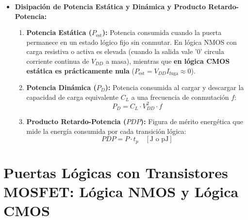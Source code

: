 \begin{itemize}[leftmargin=*]
    \item \textbf{Disipación de Potencia Estática y Dinámica y Producto Retardo-Potencia:}
    \begin{enumerate}[label=\alph*)]
        \item \textbf{Potencia Estática ($P_{\text{est}}$):} Potencia consumida cuando la puerta permanece en un estado lógico fijo sin conmutar. En lógica NMOS con carga resistiva o activa es elevada (cuando la salida vale '0' circula corriente continua de $V_{DD}$ a masa), mientras que \textbf{en lógica CMOS estática es prácticamente nula} ($P_{\text{est}} = V_{DD} I_{\text{fuga}} \approx 0$).
        \item \textbf{Potencia Dinámica ($P_D$):} Potencia consumida al cargar y descargar la capacidad de carga equivalente $C_L$ a una frecuencia de conmutación $f$:
        \begin{equation}
            P_D = C_L \cdot V_{DD}^2 \cdot f
        \end{equation}
        \item \textbf{Producto Retardo-Potencia ($PDP$):} Figura de mérito energética que mide la energía consumida por cada transición lógica:
        \begin{equation}
            PDP = P \cdot t_p \quad [\si{\joule} \text{ o } \si{\pico\joule}]
        \end{equation}
    \end{enumerate}
\end{itemize}

\section{Puertas Lógicas con Transistores MOSFET: Lógica NMOS y Lógica CMOS}

